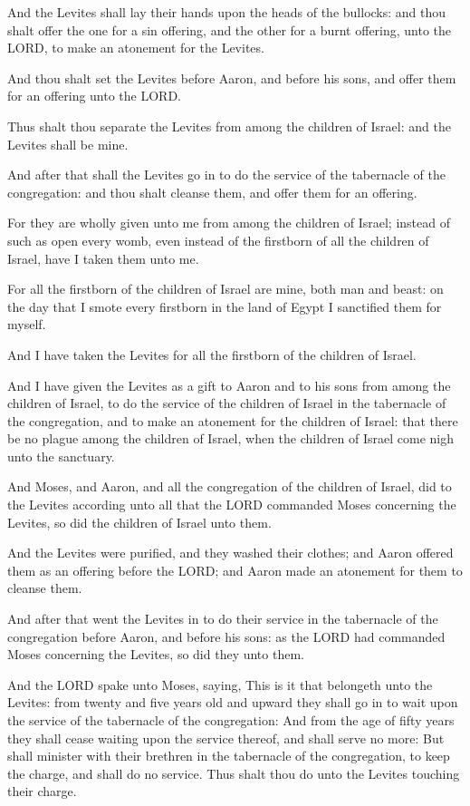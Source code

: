 \verse And the Levites shall lay their hands upon the heads of the
bullocks: and thou shalt offer the one for a sin offering, and the
other for a burnt offering, unto the LORD, to make an atonement for
the Levites.

\verse And thou shalt set the Levites before Aaron, and before his sons,
and offer them for an offering unto the LORD.

\verse Thus shalt thou separate the Levites from among the children of
Israel: and the Levites shall be mine.

\verse And after that shall the Levites go in to do the service of the
tabernacle of the congregation: and thou shalt cleanse them, and offer
them for an offering.

\verse For they are wholly given unto me from among the children of
Israel; instead of such as open every womb, even instead of the
firstborn of all the children of Israel, have I taken them unto me.

\verse For all the firstborn of the children of Israel are mine, both
man and beast: on the day that I smote every firstborn in the land of
Egypt I sanctified them for myself.

\verse And I have taken the Levites for all the firstborn of the
children of Israel.

\verse And I have given the Levites as a gift to Aaron and to his sons
from among the children of Israel, to do the service of the children
of Israel in the tabernacle of the congregation, and to make an
atonement for the children of Israel: that there be no plague among
the children of Israel, when the children of Israel come nigh unto the
sanctuary.

\verse And Moses, and Aaron, and all the congregation of the children of
Israel, did to the Levites according unto all that the LORD commanded
Moses concerning the Levites, so did the children of Israel unto them.

\verse And the Levites were purified, and they washed their clothes; and
Aaron offered them as an offering before the LORD; and Aaron made an
atonement for them to cleanse them.

\verse And after that went the Levites in to do their service in the
tabernacle of the congregation before Aaron, and before his sons: as
the LORD had commanded Moses concerning the Levites, so did they unto
them.

\verse And the LORD spake unto Moses, saying, \verse This is it that
belongeth unto the Levites: from twenty and five years old and upward
they shall go in to wait upon the service of the tabernacle of the
congregation: \verse And from the age of fifty years they shall cease
waiting upon the service thereof, and shall serve no more: \verse But
shall minister with their brethren in the tabernacle of the
congregation, to keep the charge, and shall do no service. Thus shalt
thou do unto the Levites touching their charge.


